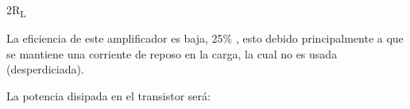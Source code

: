 \documentclass[12pt]{article}
\begin{document}
\begin{adjustwidth}{0.0in}{0.18in}
\begin{Center}
{\fontsize{6pt}{7.2pt}\selectfont 2R\textsubscript{L}\par}
\end{Center}\par

\end{adjustwidth}


\vspace{\baselineskip}
\begin{adjustwidth}{0.86in}{0.88in}
\begin{justify}
La eficiencia de este amplificador es baja, 25$\%$ , esto debido principalmente a que se mantiene una corriente de reposo en la carga, la cual no es usada (desperdiciada).
\end{justify}\par

\end{adjustwidth}


\vspace{\baselineskip}
\begin{adjustwidth}{1.07in}{0.0in}
La potencia disipada en el transistor será:\par

\end{adjustwidth}


\vspace{\baselineskip}


\end{document}
